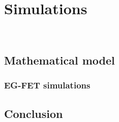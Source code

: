 \chapter{Simulations}
\label{cap:chapter5}

\newpage
\thispagestyle{empty}
\ %
\newpage


\section{Mathematical model}
\label{sec:model}


\subsection{EG-FET simulations}
\label{sec:EGFET_simulations}


\section{Conclusion}


\newpage
\thispagestyle{empty}
\ %
\newpage